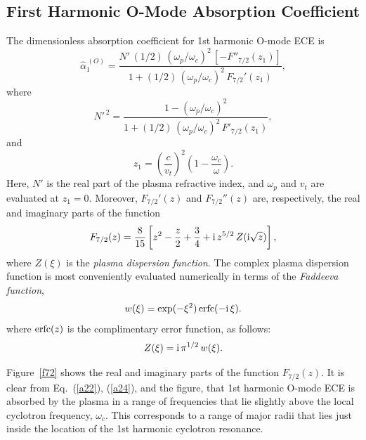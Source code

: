 \documentclass[12pt,prb,aps]{revtex4-1}
\begin{document}
\subsection{First Harmonic O-Mode Absorption Coefficient} 
The dimensionless absorption coefficient for 1st harmonic O-mode ECE is\,\cite{bornatici}
\begin{equation}\label{a22}
\hat{\alpha}_1^{\,(O)}=\frac{N'\,(1/2)\,(\omega_p/\omega_c)^2\,[-F''_{7/2}(z_1)]}{1+(1/2)\,(\omega_p/\omega_c)^2\,F_{7/2}'(z_1)},
\end{equation}
where
\begin{equation}
N'^{\,2}=\frac{1-(\omega_p/\omega_c)^2}{1+(1/2)\,(\omega_p/\omega_c)^2\,F'_{7/2}(z_1)},
\end{equation}
and
\begin{equation}\label{a24}
z_1=\left(\frac{c}{v_t}\right)^2\left(1-\frac{\omega_c}{\omega}\right).
\end{equation}
Here, $N'$ is the real part of the plasma refractive index, and $\omega_p$ and $v_t$ are evaluated at $z_1=0$. Moreover,
$F_{7/2}'(z)$ and $F_{7/2}''(z)$ are, respectively,  the real and imaginary parts of
the function\,\cite{bornatici}
\begin{equation}
F_{7/2}(z) =\frac{8}{15}\left[z^2-\frac{z}{2}+\frac{3}{4}+{\rm i}\,z^{5/2}\,Z({\rm i}\sqrt{z})\right],
\end{equation}
where $Z(\xi)$ is the {\em plasma dispersion function}.\cite{plasma} The complex plasma dispersion function is most conveniently evaluated numerically 
in terms of the {\em Faddeeva function},\cite{faddeeva}
\begin{equation}
w(\xi) = \exp(-\xi^2)\,{\rm erfc}(-{\rm i}\,\xi).
\end{equation}
where ${\rm erfc}(z)$ is the complimentary error function,\cite{as} 
as follows:
\begin{equation}
Z(\xi)= {\rm i}\,\pi^{1/2}\,w(\xi).
\end{equation}

 Figure~\ref{f72} shows the real and imaginary parts of the function $F_{7/2}(z)$. It is clear from Eq.~(\ref{a22}),
(\ref{a24}), and the figure, that 1st harmonic O-mode  ECE is absorbed by the plasma in a range of frequencies that lie slightly above the local cyclotron frequency,
$\omega_c$. This corresponds to a range of major radii that lies just inside the location of the 1st harmonic cyclotron resonance. 
\end{document}

